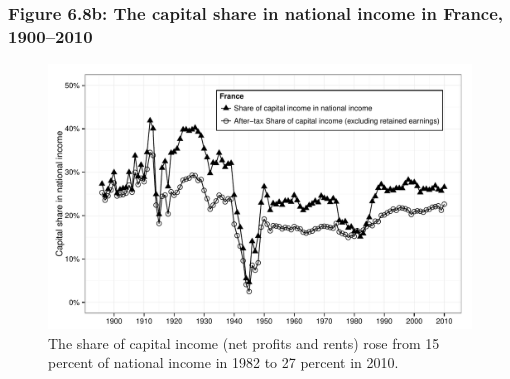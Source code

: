 \documentclass[t]{beamer}\usepackage[]{graphicx}\usepackage[]{color}
\newenvironment{knitrout}{}{} %
\begin{document}
\begin{frame}[label=Figure_6_8b]
\frametitle{Figure 6.8b: The capital share in national income in France, 1900--2010}
\begin{figure}[t]
\begin{minipage}[b]{\textwidth}
\centering
\begin{knitrout}\footnotesize
{}\color{fgcolor}

{\centering \includegraphics[width=1\linewidth]{figures/bw/Figure_6_8b} 

}



\end{knitrout}
\caption{The share of capital income (net profits and rents) rose from 15 percent of national income in 1982 to 27 percent in 2010.}
\end{minipage}
\end{figure}
\end{frame}
\end{document}
